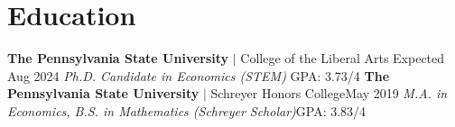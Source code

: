 \section{Education}
  \resumeSubHeadingListStart
  \resumeSubSubheading
  {\textbf{The Pennsylvania State University} $|$ College of the Liberal Arts }{Expected Aug 2024}
  \resumeSubSubheading
  {\emph{Ph.D. Candidate in Economics (STEM)} }{GPA: 3.73/4}
      \resumeItemListStart
      \resumeItemListEnd
      \resumeSubSubheading
  {\textbf{The Pennsylvania State University} $|$ Schreyer Honors College}{May 2019}
  \resumeSubSubheading
  {\emph{M.A. in Economics, B.S. in Mathematics (Schreyer Scholar)}}{GPA: 3.83/4}
    \resumeSubHeadingListEnd